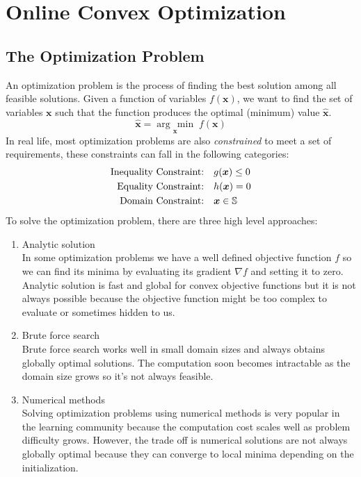 \documentclass[11pt]{article}
\newcommand{\argmin}[1]{\underset{#1}{\operatorname{arg}\,\operatorname{min}}\;}
\begin{document}
\section{Online Convex Optimization}

\subsection{The Optimization Problem}
An optimization problem is the process of finding the best solution among all feasible solutions. Given a function of variables $f(\bm{x})$, we want to find the set of variables $\bm{x}$ such that the function produces the optimal (minimum) value $\hat{\bm{x}}$.
\begin{equation*}
    \hat{\bm{x}} = \argmin{\bm{x}} f(\bm{x})
\end{equation*}
In real life, most optimization problems are also \textit{constrained} to meet a set of requirements, these constraints can fall in the following categories:
\begin{align*}
    \text{Inequality Constraint:\quad} & g(\bm{x}) \leq 0 \\
    \text{Equality Constraint:\quad} & h(\bm{x}) = 0 \\
    \text{Domain Constraint:\quad} & \bm{x} \in \mathbb{S}
\end{align*}
To solve the optimization problem, there are three high level approaches:
\begin{enumerate}
    \item Analytic solution\\[1ex]
          In some optimization problems we have a well defined objective function $f$ so we can find its minima by evaluating its gradient $\nabla f$ and setting it to zero. Analytic solution is fast and global for convex objective functions but it is not always possible because the objective function might be too complex to evaluate or sometimes hidden to us.
    \item Brute force search\\[1ex]
          Brute force search works well in small domain sizes and always obtains globally optimal solutions. The computation soon becomes intractable as the domain size grows so it's not always feasible.
    \item Numerical methods\\[1ex]
          Solving optimization problems using numerical methods is very popular in the learning community because the computation cost scales well as problem difficulty grows. However, the trade off is numerical solutions are not always globally optimal because they can converge to local minima depending on the initialization.
\end{enumerate}
\end{document}
